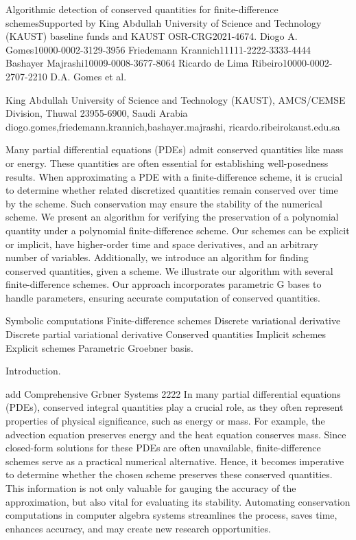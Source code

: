 \documentclass{article}
\begin{document}
{Algorithmic detection of conserved quantities for finite-difference schemes{Supported by King Abdullah University of Science and Technology (KAUST) baseline funds and KAUST OSR-CRG2021-4674.}}
{Diogo A. Gomes{1}{0000-0002-3129-3956} 
	Friedemann Krannich{1}{1111-2222-3333-4444} 
	Bashayer Majrashi{1}{0009-0008-3677-8064 } 
	Ricardo de Lima Ribeiro{1}{0000-0002-2707-2210}}
{D.A. Gomes et al.}
{King Abdullah University of Science and Technology (KAUST), AMCS/CEMSE Division, Thuwal 23955-6900, Saudi Arabia	{{diogo.gomes,friedemann.krannich,bashayer.majrashi, ricardo.ribeirokaust.edu.sa}}


	Many partial differential equations (PDEs) admit conserved quantities like mass or energy. These quantities are often essential for establishing well-posedness results. When approximating a PDE with a finite-difference scheme, it is crucial to determine whether related discretized quantities remain conserved over time by the scheme. Such conservation may ensure the stability of the numerical scheme. We present an algorithm for verifying the preservation of a polynomial quantity under a polynomial finite-difference scheme. Our schemes can be explicit or implicit, have higher-order time and space derivatives, and an arbitrary number of variables. Additionally, we introduce an algorithm for finding conserved quantities, given a scheme. We illustrate our algorithm with several finite-difference schemes. Our approach incorporates parametric G bases to handle parameters, ensuring accurate computation of conserved quantities.
	
	
	{Symbolic computations  Finite-difference schemes  Discrete variational derivative  Discrete partial variational derivative  Conserved quantities  Implicit schemes  Explicit schemes  Parametric Groebner basis.}


Introduction.


{  add 
Comprehensive Gr{}bner Systems 2222
}
In many partial differential equations (PDEs), conserved integral quantities play a crucial role, as they often represent properties of physical significance, such as energy or mass. For example, the advection equation preserves energy and the heat equation conserves mass. 
Since closed-form solutions for these PDEs are often unavailable, finite-difference schemes serve as a practical numerical alternative. Hence, it becomes imperative to determine whether the chosen scheme preserves these conserved quantities. This information is not only valuable for gauging the accuracy of the approximation, but also vital for evaluating its stability. Automating conservation computations in computer algebra systems streamlines the process, saves time, enhances accuracy, and may create new research opportunities.

}
\end{document}
